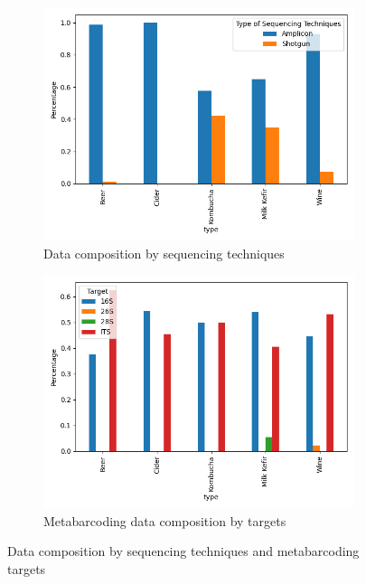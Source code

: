         \begin{figure}[H]
             \centering
             \begin{subfigure}[b]{0.45\textwidth}
                \centering
                \includegraphics[scale=0.5]{images/methods/data_composition_by_sequencing_techniques.png}
                \caption{Data composition by sequencing techniques}
                \label{fig:methods:data_composition_by_sequencing_techniques}
             \end{subfigure}
             \hfill
             \begin{subfigure}[b]{0.45\textwidth}
                \centering
                \includegraphics[scale=0.5]{images/methods/metabarcoding_data_composition_by_targets.png}
                \caption{Metabarcoding data composition by targets}
                \label{fig:methods:metabarcoding_data_composition_by_targets}
             \end{subfigure}
                \caption{Data composition by sequencing techniques and metabarcoding targets}
                \label{fig:metabarcoding_data}
        \end{figure}

